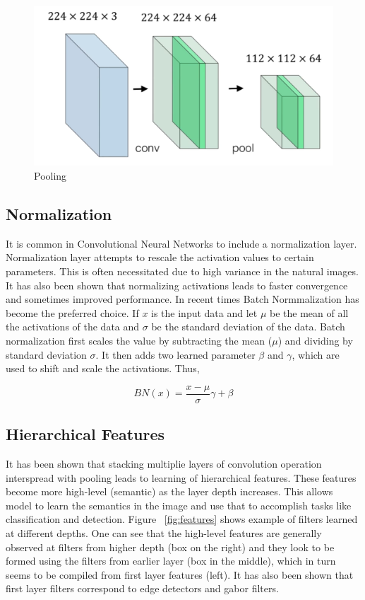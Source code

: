 \begin{figure}[H]
	\centering
   \includegraphics[scale=0.30]{figures/intro/pool.png}
   \caption[Pooling]{Pooling}
   \label{fig:pool}
\end{figure}

\subsection{Normalization}

It is common in Convolutional Neural Networks to include a normalization layer. Normalization layer attempts to rescale the activation values to certain parameters. This is often necessitated due to high variance in the natural images. It has also been shown that normalizing activations leads to faster convergence and sometimes improved performance. In recent times Batch Normmalization has become the preferred choice. If $x$ is the input data and let $\mu$ be the mean of all the activations of the data and $\sigma$ be the standard deviation of the data. Batch normalization first scales the value by subtracting the mean ($\mu$) and dividing by standard deviation $\sigma$. It then adds two learned parameter $\beta$ and $\gamma$, which are used to shift and scale the activations. Thus,

$$
BN(x) = \frac{x-\mu}{\sigma} \gamma + \beta
$$

\subsection{Hierarchical Features}
It has been shown that stacking multiplie layers of convolution operation interspread with pooling leads to learning of hierarchical features. These features become more high-level (semantic) as the layer depth increases. This allows model to learn the semantics in the image and use that to accomplish tasks like classification and detection. Figure ~\ref{fig:features} shows example of filters learned at different depths. One can see that the high-level features are generally observed at filters from higher depth (box on the right) and they look to be formed using the filters from earlier layer (box in the middle), which in turn seems to be compiled from first layer features (left). It has also been shown that first layer filters correspond to edge detectors and gabor filters.

